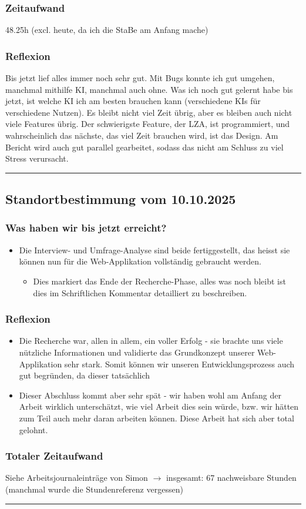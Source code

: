 \documentclass[a4paper,12pt]{article}
\newcommand{\StandortHeader}[1]{
    \subsection*{Standortbestimmung vom #1}
}
\newcommand{\StandortFooter}{
    \vspace{0.5cm}
    \hrule
    \vspace{0.5cm}
}
\begin{document}
\subsubsection*{Zeitaufwand}
48.25h (excl. heute, da ich die StaBe am Anfang mache)

\subsubsection*{Reflexion}
Bis jetzt lief alles immer noch sehr gut. Mit Bugs konnte ich gut umgehen, manchmal mithilfe KI, manchmal auch ohne. Was ich noch gut gelernt habe bis jetzt, ist welche KI ich am besten brauchen kann (verschiedene KIs für verschiedene Nutzen). Es bleibt nicht viel Zeit übrig, aber es bleiben auch nicht viele Features übrig. Der schwierigste Feature, der LZA, ist programmiert, und wahrscheinlich das nächste, das viel Zeit brauchen wird, ist das Design. Am Bericht wird auch gut parallel gearbeitet, sodass das nicht am Schluss zu viel Stress verursacht.
\StandortFooter

\StandortHeader{10.10.2025}
\subsubsection*{Was haben wir bis jetzt erreicht?}
\begin{itemize}
    \item Die Interview- und Umfrage-Analyse sind beide fertiggestellt, das heisst sie können nun für die Web-Applikation vollständig gebraucht werden.
    \begin{itemize}
        \item Dies markiert das Ende der Recherche-Phase, alles was noch bleibt ist dies im Schriftlichen Kommentar detailliert zu beschreiben.
    \end{itemize}
\end{itemize}

\subsubsection*{Reflexion}
\begin{itemize}
    \item Die Recherche war, allen in allem, ein voller Erfolg - sie brachte uns viele nützliche Informationen und validierte das Grundkonzept unserer Web-Applikation sehr stark. Somit können wir unseren Entwicklungsprozess auch gut begründen, da dieser tatsächlich
    \item Dieser Abschluss kommt aber sehr spät - wir haben wohl am Anfang der Arbeit wirklich unterschätzt, wie viel Arbeit dies sein würde, bzw. wir hätten zum Teil auch mehr daran arbeiten können. Diese Arbeit hat sich aber total gelohnt.
\end{itemize}

\subsubsection*{Totaler Zeitaufwand}
Siehe Arbeitsjournaleinträge von Simon $\rightarrow$ insgesamt: 67 nachweisbare Stunden (manchmal wurde die Stundenreferenz vergessen)
\StandortFooter
\end{document}
